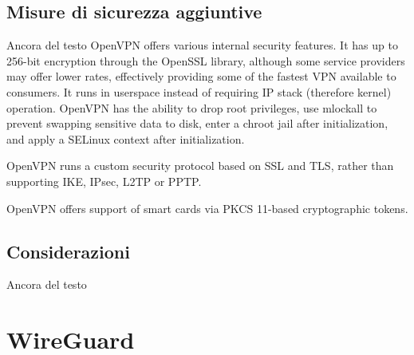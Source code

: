 \subsection{Misure di sicurezza aggiuntive}
Ancora del testo
OpenVPN offers various internal security features. It has up to 256-bit encryption through the OpenSSL library, although some service providers may offer lower rates, effectively providing some of the fastest VPN available to consumers. It runs in userspace instead of requiring IP stack (therefore kernel) operation. OpenVPN has the ability to drop root privileges, use mlockall to prevent swapping sensitive data to disk, enter a chroot jail after initialization, and apply a SELinux context after initialization.

OpenVPN runs a custom security protocol based on SSL and TLS, rather than supporting IKE, IPsec, L2TP or PPTP.

OpenVPN offers support of smart cards via PKCS 11-based cryptographic tokens.
\subsection{Considerazioni}
Ancora del testo

\section{WireGuard}
